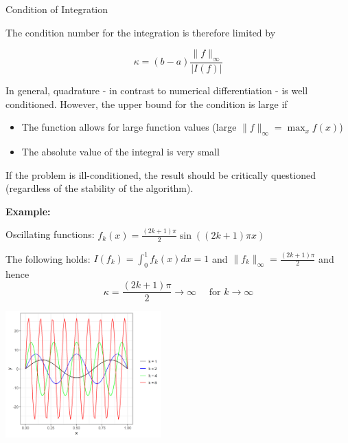 \begin{vbframe}{Condition of Integration}
\framebreak

The condition number for the integration is therefore limited by

\vspace*{-0.2cm}
$$
\kappa = (b - a) \frac{\|f\|_\infty}{|I(f)|}
$$

In general, quadrature - in contrast to numerical differentiation - is well conditioned.
However, the upper bound for the condition is large if

\begin{itemize}
\item The function allows for large function values (large $\|f\|_\infty = \max_x f(x)$)
\item The absolute value of the integral is very small
\end{itemize}

If the problem is ill-conditioned, the result should be critically questioned (regardless of the stability of the algorithm).

\framebreak

\textbf{Example:}

Oscillating functions: $f_k(x) = \frac{(2k + 1)\pi}{2}\sin((2k+1)\pi x)$

\lz

The following holds: $I(f_k) = \int_0^1 f_k(x) dx = 1$ and $\|f_k\|_\infty = \frac{(2k+1)\pi}{2}$ and hence
\vspace{-0.1cm}
$$
\kappa = \frac{(2k+1)\pi}{2} \to \infty \quad \text{ for } k \to \infty
$$

\begin{center}
\includegraphics[width=0.45\textwidth]{figure_man/Example1.png}
\end{center}

%
%



\end{vbframe}
